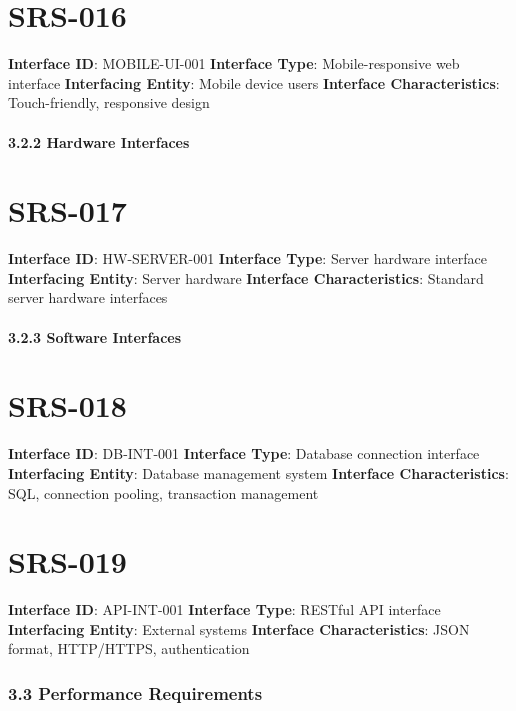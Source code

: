 \section{SRS-016}\label{SRS-016}

\textbf{Interface ID}: MOBILE-UI-001
\textbf{Interface Type}: Mobile-responsive web interface
\textbf{Interfacing Entity}: Mobile device users
\textbf{Interface Characteristics}: Touch-friendly, responsive design

\paragraph{3.2.2 Hardware Interfaces}

\section{SRS-017}\label{SRS-017}

\textbf{Interface ID}: HW-SERVER-001
\textbf{Interface Type}: Server hardware interface
\textbf{Interfacing Entity}: Server hardware
\textbf{Interface Characteristics}: Standard server hardware interfaces

\paragraph{3.2.3 Software Interfaces}

\section{SRS-018}\label{SRS-018}

\textbf{Interface ID}: DB-INT-001
\textbf{Interface Type}: Database connection interface
\textbf{Interfacing Entity}: Database management system
\textbf{Interface Characteristics}: SQL, connection pooling, transaction management

\section{SRS-019}\label{SRS-019}

\textbf{Interface ID}: API-INT-001
\textbf{Interface Type}: RESTful API interface
\textbf{Interfacing Entity}: External systems
\textbf{Interface Characteristics}: JSON format, HTTP/HTTPS, authentication

\subsubsection{3.3 Performance Requirements}

